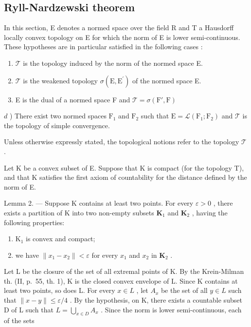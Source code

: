 \subsection{Ryll-Nardzewski theorem}

In this section, E denotes a normed space over the field R and T a Hausdorff locally convex topology on E for which the norm of E is lower semi-continuous. These hypotheses are in particular satisfied in the following cases :

\begin{enumerate}
\def\labelenumi{\alph{enumi})}
\item
  \(\mathcal{T}\) is the topology induced by the norm of the normed space E.
\item
  \(\mathcal{T}\) is the weakened topology \(\sigma (\mathrm{E},\mathrm{E}^{\prime})\) of the normed space E.
\item
  E is the dual of a normed space F and \(\mathcal{T} = \sigma (\mathrm{F}',\mathrm{F})\)
\end{enumerate}

\(d\) ) There exist two normed spaces \(\mathrm{F}_1\) and \(\mathrm{F}_2\) such that \(\mathrm{E} = \mathcal{L}(\mathrm{F}_1;\mathrm{F}_2)\) and \(\mathcal{T}\) is the topology of simple convergence.

Unless otherwise expressly stated, the topological notions refer to the topology \(\mathcal{T}\) .

Let K be a convex subset of E. Suppose that K is compact (for the topology T), and that K satisfies the first axiom of countability for the distance defined by the norm of E.

Lemma 2. --- Suppose K contains at least two points. For every \(\varepsilon > 0\) , there exists a partition of K into two non-empty subsets \(\mathbf{K}_1\) and \(\mathbf{K}_2\) , having the following properties:

\begin{enumerate}
\def\labelenumi{\alph{enumi})}
\item
  \(\mathrm{K}_1\) is convex and compact;
\item
  we have \(\| x_1 - x_2\| < \varepsilon\) for every \(x_{1}\) and \(x_{2}\) in \(\mathbf{K}_2\) .
\end{enumerate}

Let L be the closure of the set of all extremal points of K. By the Krein-Milman th. (II, p.~55, th. 1), K is the closed convex envelope of L. Since K contains at least two points, so does L. For every \(x \in L\) , let \(A_{x}\) be the set of all \(y \in L\) such that \(\|x - y\| \leqslant \varepsilon/4\) . By the hypothesis, on K, there exists a countable subset D of L such that \(L = \bigcup_{x \in D} A_{x}\) . Since the norm is lower semi-continuous, each of the sets

